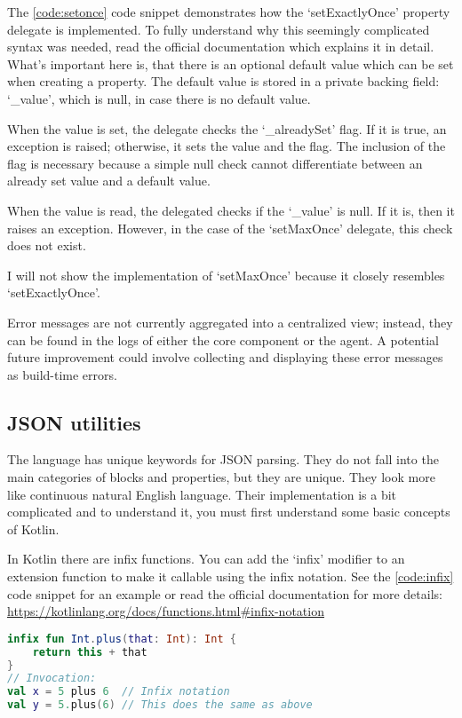 The \ref{code:setonce} code snippet demonstrates how the `setExactlyOnce' property delegate is implemented. To fully understand why this seemingly complicated syntax was needed, read the official documentation which explains it in detail. What's important here is, that there is an optional default value which can be set when creating a property. The default value is stored in a private backing field: `\_value', which is null, in case there is no default value. 

When the value is set, the delegate checks the `\_alreadySet' flag. If it is true, an exception is raised; otherwise, it sets the value and the flag. The inclusion of the flag is necessary because a simple null check cannot differentiate between an already set value and a default value.

When the value is read, the delegated checks if the `\_value' is null. If it is, then it raises an exception. However, in the case of the `setMaxOnce' delegate, this check does not exist.

I will not show the implementation of `setMaxOnce' because it closely resembles `setExactlyOnce'.

Error messages are not currently aggregated into a centralized view; instead, they can be found in the logs of either the core component or the agent. A potential future improvement could involve collecting and displaying these error messages as build-time errors.

\subsection{JSON utilities}

The language has unique keywords for JSON parsing. They do not fall into the main categories of blocks and properties, but they are unique. They look more like continuous natural English language. Their implementation is a bit complicated and to understand it, you must first understand some basic concepts of Kotlin.

In Kotlin there are infix functions. You can add the `infix' modifier to an extension function to make it callable using the infix notation. See the \ref{code:infix} code snippet for an example or read the official documentation for more details: \url{https://kotlinlang.org/docs/functions.html#infix-notation}

\begin{lstlisting}[caption={Infix functions},language=Kotlin,label=code:infix]
infix fun Int.plus(that: Int): Int {
    return this + that
}
// Invocation:
val x = 5 plus 6  // Infix notation
val y = 5.plus(6) // This does the same as above
\end{lstlisting}

